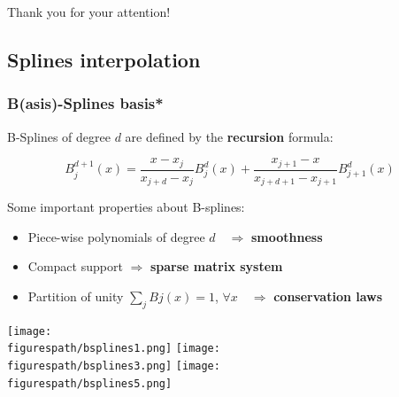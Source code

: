 \documentclass[10pt]{beamer}
\newcommand{\figurespath}{./figures}
\begin{document}
\begin{frame}
\centering
\Huge{Thank you for your attention!}
\end{frame}


\subsection*{Splines interpolation}
\begin{frame}
	\frametitle{B(asis)-Splines basis*}

	B-Splines of degree $d$ are defined by the \textbf{recursion} formula: 

	\begin{equation}
	B_j^{d+1}(x)= \dfrac{x - x_j}{x_{j+d}-x_j} B_j^d(x)+ \dfrac{x_{j+1} - x}{x_{j+d+1} - x_{j+1}} B_{j+1}^d (x)
	\end{equation}

	Some important properties about B-splines:

	\begin{itemize}
		\item Piece-wise polynomials of degree $d \quad \Rightarrow$ \textbf{smoothness} 
		\item Compact support $\Rightarrow$ \textbf{sparse matrix system}
		\item Partition of unity $\sum_j Bj (x) = 1$, $\forall x \quad \Rightarrow$ \textbf{conservation laws}
	\end{itemize}

	\begin{center}
		\texttt{[image: \\figurespath/bsplines1.png]}
		\texttt{[image: \\figurespath/bsplines3.png]}
		\texttt{[image: \\figurespath/bsplines5.png]}
	\end{center}

\end{frame}
\end{document}
